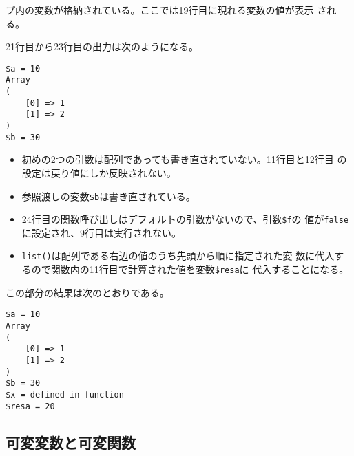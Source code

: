 \begin{Exec}
\begin{itemize}
       プ内の変数が格納されている。ここでは19行目に現れる変数の値が表示
       される。
\end{itemize}
21行目から23行目の出力は次のようになる。
\begin{Verbatim}[fontsize=\footnotesize]
$a = 10
Array
(
    [0] => 1
    [1] => 2
)
$b = 30
\end{Verbatim}
\begin{itemize}
 \item 初めの2つの引数は配列であっても書き直されていない。11行目と12行目
       の設定は戻り値にしか反映されない。
 \item 参照渡しの変数\Verb+$b+は書き直されている。
\end{itemize}
 \iffalse
 \begin{listingcont}
list($resa) = example($a, $as, $b);
print "\$resa = $resa\n";
?>
 \end{listingcont}
 \fi
 \begin{itemize}
 \item 24行目の関数呼び出しはデフォルトの引数がないので、引数\Verb+$f+の
       値が\texttt{false}に設定され、9行目は実行されない。
 \item \texttt{list()}は配列である右辺の値のうち先頭から順に指定された変
       数に代入するので関数内の11行目で計算された値を変数\Verb+$resa+に
       代入することになる。
 \end{itemize}
この部分の結果は次のとおりである。
\begin{Verbatim}[fontsize=\footnotesize]
$a = 10
Array
(
    [0] => 1
    [1] => 2
)
$b = 30
$x = defined in function
$resa = 20
\end{Verbatim}
\end{Exec}
\iffalse\else
\subsection{可変変数と可変関数}
 \iffalse\else
